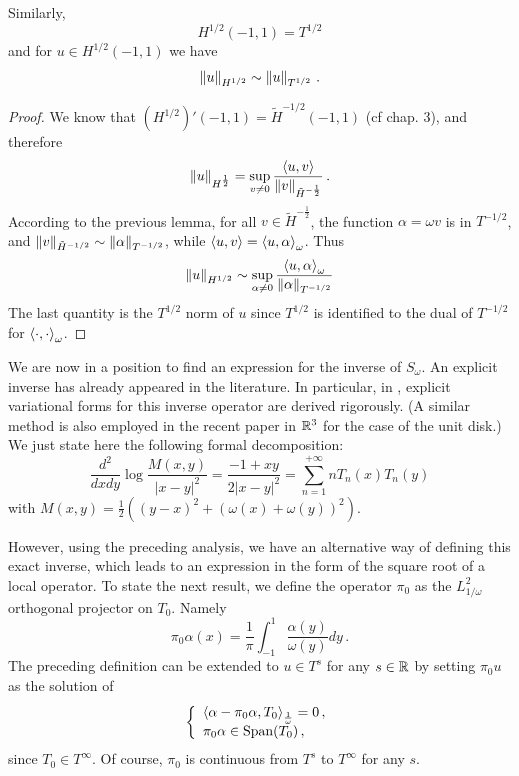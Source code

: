 \documentclass[a4paper]{article}
\begin{document}
\begin{Lem} Similarly,
	\[H^{1/2}(-1,1) = T^{1/2}\]
	and for $u \in H^{1/2}(-1,1)$ we have
	\[\left\|u\right\|_{H^{1/2}} \sim \left\|u\right\|_{T^{1/2}}\,.\]
	\label{LemmaT1/2}
\end{Lem}	
\begin{proof}
	We know that $(H^{1/2})'(-1,1) =  \tilde{H}^{-1/2}(-1,1)$ (cf \cite{mclean1986spectral} chap. 3), and therefore
	\[\left\|u\right\|_{H^{\frac{1}{2}}} = \sup_{ v\neq 0} \dfrac{\left\langle u,v\right\rangle}{\left\|v\right\|_{\tilde{H}^{-\frac{1}{2}}}}\,.\]
	According to the previous lemma, for all $v\in \tilde{H}^{-\frac{1}{2}}$, the function $\alpha = \omega v$ is in $T^{-1/2}$, and $\left\| v\right\|_{\tilde{H}^{-1/2}} \sim \left\|\alpha\right\|_{T^{-1/2}}$, while $\left\langle u,v\right\rangle = \left\langle u,\alpha\right\rangle_\omega$. Thus 
	\[\left\|u\right\|_{H^{1/2}} \sim \sup_{\alpha \neq 0} \dfrac{\left\langle u,\alpha\right\rangle_\omega}{\left\|\alpha\right\|_{T^{-1/2}}}\]
	The last quantity is the $T^{1/2}$ norm of $u$ since $T^{1/2}$ is identified to the dual of $T^{-1/2}$ for $\left\langle \cdot,\cdot\right\rangle_\omega$. 
\end{proof}

We are now in a position to find an expression for the inverse of $S_\omega$. An explicit inverse has already appeared in the literature. In 
particular, in \cite{jerez2012explicit,urzua2014optimal}, explicit variational forms for this inverse operator are derived rigorously. (A similar method is also employed in the recent paper \cite{hiptmair2017closed} in $\mathbb{R}^3$ for the case of the unit disk.) We just state here the following formal decomposition:
\[\dfrac{d^2}{dxdy}\log\frac{M(x,y)}{|x-y|^2} = \frac{-1+xy}{2|x-y|^2} = \sum_{n=1}^{+ \infty} n T_n(x)T_n(y)\]
with 
$M(x,y) = \frac{1}{2}\left((y-x)^2 + (\omega(x) + \omega(y))^2\right) $.

However, using the preceding analysis, we have an alternative way of defining this exact inverse, which leads to an expression in the form of the square root of a local operator. To state the next result, we define the operator $\pi_{0}$ as the $L^2_{1/\omega}$ 
orthogonal projector on $T_0$. Namely 
\[\pi_0 \alpha(x)  = \frac{1}{\pi} \int_{-1}^{1}\frac{\alpha(y)}{\omega(y)}dy\,.\]
The preceding definition can be extended to $u \in T^s$ for any $s \in \mathbb{R}$ by setting $\pi_0 u$ as the solution of
\[\left\{
\begin{array}{l}\left\langle \alpha-\pi_0 \alpha,T_0\right\rangle_{\frac{1}{\omega}} = 0\,,\\
\pi_0\alpha\in \mbox{Span}(T_0)\,,
\end{array}
\right.\]
since $T_0\in T^\infty$. Of course, $\pi_0$ is continuous from $T^s$ to $T^{\infty}$ for any $s$. 
\end{document}
